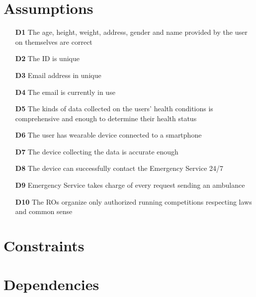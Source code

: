 \section{Assumptions}
\begin{itemize}
\item	[\textbf{D1}] The age, height, weight, address, gender and name provided by the user on themselves are correct
\item	[\textbf{D2}] The ID is unique
\item	[\textbf{D3}] Email address in unique
\item	[\textbf{D4}] The email is currently in use
\item	[\textbf{D5}] The kinds of data collected on the users’ health conditions is comprehensive and enough to determine their health status
\item	[\textbf{D6}] The user has wearable device connected to a smartphone
\item	[\textbf{D7}] The device collecting the data is accurate enough 
\item	[\textbf{D8}] The device can successfully contact the Emergency Service 24/7
\item	[\textbf{D9}] Emergency Service takes charge of every request sending an ambulance
\item	[\textbf{D10}] The ROs organize only authorized running competitions respecting laws and common sense
\end{itemize}

\section{Constraints}
\section{Dependencies}

